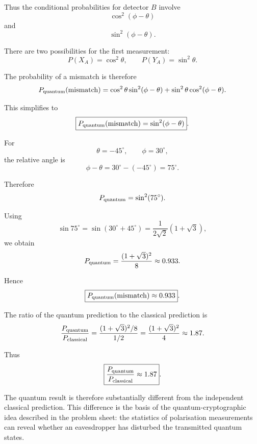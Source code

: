 \documentclass[11pt,a4paper]{article}
\begin{document}
Thus the conditional probabilities for detector $B$ involve
\[
\cos^2(\phi-\theta)
\]
and
\[
\sin^2(\phi-\theta).
\]

There are two possibilities for the first measurement:
\[
P(X_A)=\cos^2\theta,
\qquad
P(Y_A)=\sin^2\theta.
\]

The probability of a mismatch is therefore
\[
P_{\rm quantum}(\mathrm{mismatch})
=
\cos^2\theta\sin^2(\phi-\theta)
+
\sin^2\theta\cos^2(\phi-\theta).
\]

This simplifies to
\[
\boxed{
P_{\rm quantum}(\mathrm{mismatch})
=
\sin^2(\phi-\theta)
}.
\]

For
\[
\theta=-45^\circ,
\qquad
\phi=30^\circ,
\]
the relative angle is
\[
\phi-\theta
=
30^\circ-(-45^\circ)
=
75^\circ.
\]

Therefore
\[
P_{\rm quantum}
=
\sin^2(75^\circ).
\]

Using
\[
\sin75^\circ
=
\sin(30^\circ+45^\circ)
=
\frac{1}{2\sqrt2}(1+\sqrt3),
\]
we obtain
\[
P_{\rm quantum}
=
\frac{(1+\sqrt3)^2}{8}
\approx0.933.
\]

Hence
\[
\boxed{
P_{\rm quantum}(\mathrm{mismatch})\approx0.933
}.
\]

The ratio of the quantum prediction to the classical prediction is
\[
\frac{P_{\rm quantum}}{P_{\rm classical}}
=
\frac{(1+\sqrt3)^2/8}{1/2}
=
\frac{(1+\sqrt3)^2}{4}
\approx1.87.
\]

Thus
\[
\boxed{
\frac{P_{\rm quantum}}{P_{\rm classical}}\approx1.87
}.
\]

The quantum result is therefore substantially different from the independent
classical prediction. This difference is the basis of the quantum-cryptographic
idea described in the problem sheet: the statistics of polarisation measurements
can reveal whether an eavesdropper has disturbed the transmitted quantum states.
\end{document}
